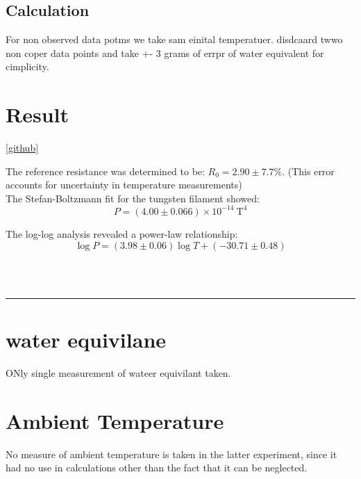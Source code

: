 \documentclass[%
 sor,
 jor,
 amsmath,amssymb,
 reprint,%
]{revtex4-2}
\begin{document}
\subsection{Calculation}
For non observed data potms we take sam einital temperatuer. disdcaard twwo non coper data points and take +- 3 grams of errpr of water equivalent for cimplicity. 

\section{Result}
\ref{github}

The reference resistance was determined to be: $R_0 = 2.90 \pm 7.7\% $. (This error accounts for uncertainty in temperature measurements)\\

The Stefan-Boltzmann fit for the tungsten filament showed:
$$
P = (4.00 \pm 0.066) \times 10^{-14}\ \mathrm{T^4}
$$

The log-log analysis revealed a power-law relationship:
$$
\log P = (3.98 \pm 0.06)\log T + (-30.71 \pm 0.48)
$$

\noindent{}\\
\\

\noindent\rule{\linewidth}{0.4pt}
\vspace{2cm}
\appendix
\section{water equivilane}\label{appendix:prevexp}
ONly single measurement of wateer equivilant taken.
\section{Ambient Temperature}
No measure of ambient temperature is taken in the latter experiment, since it had no use in calculations other than the fact that it can be neglected. 


\end{document}
